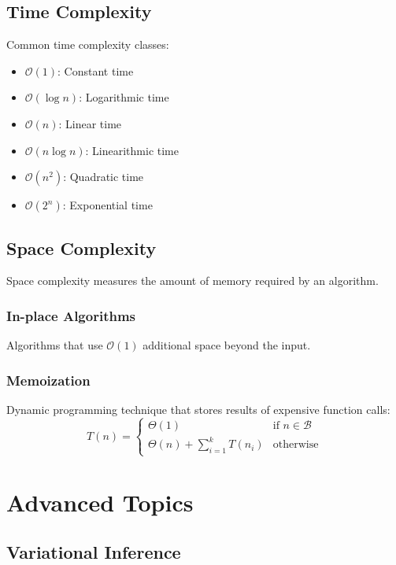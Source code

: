 \documentclass{article}
\begin{document}
\subsection{Time Complexity}

Common time complexity classes:
\begin{itemize}
\item $\mathcal{O}(1)$: Constant time
\item $\mathcal{O}(\log n)$: Logarithmic time
\item $\mathcal{O}(n)$: Linear time
\item $\mathcal{O}(n \log n)$: Linearithmic time
\item $\mathcal{O}(n^2)$: Quadratic time
\item $\mathcal{O}(2^n)$: Exponential time
\end{itemize}

\subsection{Space Complexity}

Space complexity measures the amount of memory required by an algorithm.

\subsubsection{In-place Algorithms}

Algorithms that use $\mathcal{O}(1)$ additional space beyond the input.

\subsubsection{Memoization}

Dynamic programming technique that stores results of expensive function calls:
\[
T(n) = \begin{cases}
\Theta(1) & \text{if } n \in \mathcal{B} \\
\Theta(n) + \sum_{i=1}^k T(n_i) & \text{otherwise}
\end{cases}
\]

\section{Advanced Topics}

\subsection{Variational Inference}
\end{document}
